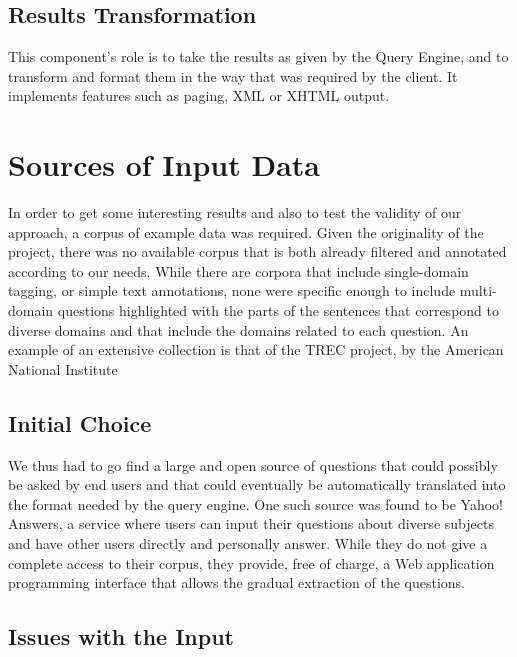 \subsection{Results Transformation} %
\label{sub:results_transformation}
This component's role is to take the results as given by the Query Engine, and to transform and format them in the way that was required by the client. It implements features such as paging, XML or XHTML output.


\section{Sources of Input Data} %
\label{sec:sources_of_input_data}

In order to get some interesting results and also to test the validity of our approach, a corpus of example data was required. Given the originality of the project, there was no available corpus that is both already filtered and annotated according to our needs. While there are corpora that include single-domain tagging, or simple text annotations, none were specific enough to include multi-domain questions highlighted with the parts of the sentences that correspond to diverse domains and that include the domains related to each question. An example of an extensive collection is that of the TREC project, by the American National Institute

\subsection{Initial Choice} %
\label{sub:initial_choice}

We thus had to go find a large and open source of questions that could possibly be asked by end users and that could eventually be automatically translated into the format needed by the query engine. One such source was found to be Yahoo! Answers, a service where users can input their questions about diverse subjects and have other users directly and personally answer. While they do not give a complete access to their corpus, they provide, free of charge, a Web application programming interface that allows the gradual extraction of the questions.



\subsection{Issues with the Input} %
\label{sub:issues_with_the_input}

